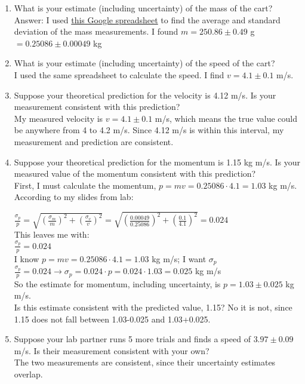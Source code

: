 \documentclass{article}
\begin{document}
\begin{enumerate}
	\item What is your estimate (including uncertainty) of the mass of the cart?\\
	Answer: I used \href{https://docs.google.com/spreadsheets/d/1X5Ok14Y5Rkm_orYHjFNCjtL3NYZ63yXkAczzOlAsNw4/edit?usp=sharing}{this Google spreadsheet} to find the average and standard deviation of the mass measurements. I found $m=250.86\pm 0.49$ g $= 0.25086\pm 0.00049$ kg
	\item What is your estimate (including uncertainty) of the speed of the cart?\\
	I used the same spreadsheet to calculate the speed. I find $v=4.1\pm0.1$ m/s.
	\item Suppose your theoretical prediction for the velocity is 4.12 m/s. Is your measurement consistent with this prediction?\\
	My measured velocity is $v=4.1\pm0.1$ m/s, which means the true value could be anywhere from 4 to 4.2 m/s. Since 4.12 m/s is within this interval, my measurement and prediction are consistent.
	\item Suppose your theoretical prediction for the momentum is 1.15 kg m/s. Is your measured value of the momentum consistent with this prediction?\\
	First, I must calculate the momentum, $p=mv=0.25086\cdot 4.1=1.03$ kg m/s. According to my slides from lab: 

		$\frac{\sigma_p}{p} = \sqrt{\left(\frac{\sigma_m}{m}\right)^2+\left(\frac{\sigma_v}{v}\right)^2}=\sqrt{\left(\frac{0.00049}{0.25086}\right)^2+\left(\frac{0.1}{4.1}\right)^2}=0.024$\\
		This leaves me with:\\
		$\frac{\sigma_p}{p}=0.024$\\
		I know $p=mv=0.25086\cdot 4.1=1.03$ kg m/s; I want $\sigma_p$\\
		$\frac{\sigma_p}{p}=0.024\rightarrow \sigma_p=0.024\cdot p = 0.024\cdot 1.03=0.025$ kg m/s\\
		
		So the estimate for momentum, including uncertainty, is $p=1.03\pm 0.025$ kg m/s.\\
		Is this estimate consistent with the predicted value, 1.15? No it is not, since 1.15 does not fall between 1.03-0.025 and 1.03+0.025.
	\item Suppose your lab partner runs 5 more trials and finds a speed of $3.97\pm0.09$ m/s. Is their measurement consistent with your own?\\
	The two measurements are consistent, since their uncertainty estimates overlap.
\end{enumerate}
\end{document}
